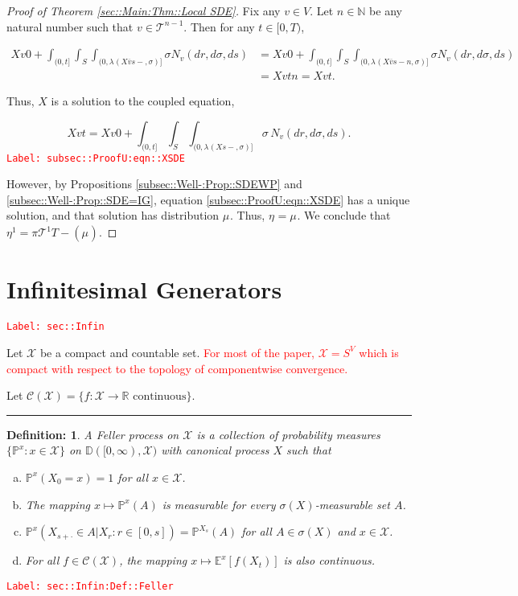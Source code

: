 \documentclass[12pt]{article}
\newcommand{\mb}{\mathbb}
\newcommand{\mc}{\mathcal}
\newcommand{\ra}{\rightarrow}
\newcommand{\ov}{\overline}
\newcommand{\te}{\text}
\newcommand{\tr}{\textcolor{red}}
\newcommand{\labe}[1]{\tr{\texttt{Label: #1}}}
\newcommand{\ind}{\hspace{24pt}}
\newcommand{\lin}{\rule{\linewidth}{0.4 pt}}
\newcommand{\pr}{\mb{P}}							%
\newcommand{\cad}{\mb{D}}							%
\renewcommand{\v}{v}							%
\renewcommand{\S}{S}							%
\newcommand{\s}{\sigma}							%
\newcommand{\T}{T}								%
\renewcommand{\t}{t}							%
\newcommand{\proj}{\pi}							%
\renewcommand{\tt}{s}							%
\newcommand{\X}{X}								%
\newcommand{\cl}{\ov}							%
\newcommand{\tree}{\mc{T}}						%
\newcommand{\sln}[1]{^{#1}}						%
\newcommand{\poiss}[1]{N_{#1}}						%
\renewcommand{\r}{r}								%
\newcommand{\m}[3]{\mu_{#2#1}^{#3}}						%
\newcommand{\mmm}[3]{\eta_{#2#1}^{#3}}						%
\newcommand{\rate}[1]{\lambda_{#1}}					%
\newtheorem{defn}[thms]{Definition: }
\begin{document}
\begin{proof}[Proof of Theorem \ref{sec::Main:Thm::Local SDE}]
\ind Fix any \(\v\in V\). Let \(n\in \mb{N}\) be any natural number such that \(\v\in \tree\sln{n-1}\). Then for any \(\t \in [0,\T)\),

\begin{align*}
\X{\v}{0} + \int_{(0,\t]}\int_\S\int_{(0,\rate{}(\X{\cl{\v}}{\tt-},\s)]}\s\poiss{\v}(d\r,d\s,d\tt) &= \X{\v}{0} + \int_{(0,\t]}\int_\S\int_{(0,\rate{}(\X{\cl{\v}}{\tt-}{n},\s)]}\s\poiss{\v}(d\r,d\s,d\tt)\\
&=\X{\v}{\t}{n} = \X{\v}{\t}.
\end{align*}

Thus, \(\X{}{}\) is a solution to the coupled equation,

\begin{equation}
\X{\v}{\t} = \X{\v}{0} + \int_{(0,\t]}\int_\S \int_{(0,\rate{}(\X{}{\tt-},\s)]}\s\,\poiss{\v}(d\r,d\s,d\tt).
\label{subsec::ProofU:eqn::XSDE}
\end{equation}
\labe{subsec::ProofU:eqn::XSDE}

However, by Propositions \ref{subsec::Well-:Prop::SDEWP} and \ref{subsec::Well-:Prop::SDE=IG}, equation \eqref{subsec::ProofU:eqn::XSDE} has a unique solution, and that solution has distribution \(\m{}{}{}\). Thus, \(\mmm{}{}{} = \m{}{}{}\). We conclude that \(\mmm{}{}{1} = \proj{\tree\sln{1}}{\T-}(\m{}{}{})\).

\end{proof}
\newpage
\appendix

\section{Infinitesimal Generators}
\label{sec::Infin}\labe{sec::Infin}

Let \(\mc{X}\) be a compact and countable set. \tr{For most of the paper, \(\mc{X} = S^V\) which is compact with respect to the topology of componentwise convergence.}

Let \(\mc{C}(\mc{X})= \{f:\mc{X} \ra \mb{R} \te{ continuous}\}\).

\lin

\begin{defn}
A Feller process on \(\mc{X}\) is a collection of probability measures \(\{\pr^x:x \in \mc{X}\}\) on \(\cad([0,\infty),\mc{X})\) with canonical process \(X\) such that

\begin{enumerate}[(a)]
\item \(\pr^x(X_0 = x) = 1\) for all \(x \in \mc{X}\).

\item The mapping \(x \mapsto \pr^x(A)\) is measurable for every \(\sigma(X)\)-measurable set \(A\).

\item \(\pr^x(X_{s+\cdot} \in A|X_r:r \in [0,s]) = \pr^{X_s}(A)\) for all \(A \in \sigma(X)\) and \(x \in \mc{X}\).

\item For all \(f\in \mc{C}(\mc{X})\), the mapping \(x\mapsto \mb{E}^x[f(X_t)]\) is also continuous.
\end{enumerate}
\label{sec::Infin:Def::Feller}
\end{defn}
\labe{sec::Infin:Def::Feller}
\end{document}
